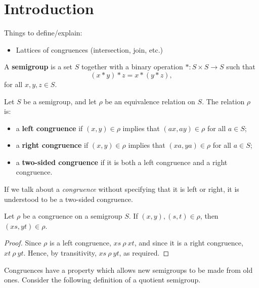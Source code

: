 \chapter{Introduction}
\label{chap:intro}

Things to define/explain:

\begin{itemize}
\item Lattices of congruences (intersection, join, etc.)
\end{itemize}

\begin{definition}
  \label{def:semigroup}
  A \textbf{semigroup} is a set $S$ together with
  a binary operation $*: S \times S \to S$ such that
  $$(x * y) * z = x * (y * z),$$
  for all $x, y, z \in S$.
\end{definition}

\begin{definition}
  \label{def:congruence}
  Let $S$ be a semigroup, and let $\rho$ be an equivalence relation on $S$.  The
  relation $\rho$ is:
  \begin{itemize}
  \item a \textbf{left congruence} if $(x, y) \in \rho$ implies that
    $(ax, ay) \in \rho$ for all $a \in S$;
  \item a \textbf{right congruence} if $(x, y) \in \rho$ implies that
    $(xa, ya) \in \rho$ for all $a \in S$;
  \item a \textbf{two-sided congruence} if it is both a left congruence and a
    right congruence.
  \end{itemize}
\end{definition}

If we talk about a \textit{congruence} without specifying that it is left or
right, it is understood to be a two-sided congruence.

\begin{proposition}
  \label{prop:cong-def}
  Let $\rho$ be a congruence on a semigroup $S$.  If $(x, y), (s, t) \in \rho$,
  then $(xs, yt) \in \rho$.
  \begin{proof}
    Since $\rho$ is a left congruence, $xs ~\rho~ xt$, and since it is a right
    congruence, $xt ~\rho~ yt$.  Hence, by transitivity, $xs ~\rho~ yt$, as
    required.
  \end{proof}
\end{proposition}

Congruences have a property which allows new semigroups to be made from old
ones.  Consider the following definition of a quotient semigroup.

